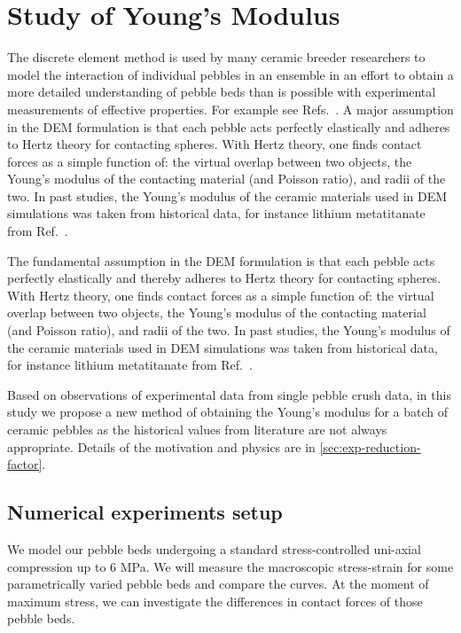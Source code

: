 \section{Study of Young's Modulus}\label{sec:dem-studies-youngs-modulus}

The discrete element method is used by many ceramic breeder researchers to model the interaction of individual pebbles in an ensemble in an effort to obtain a more detailed understanding of pebble beds than is possible with experimental measurements of effective properties. For example see Refs.~\cite{An20071393, Lu2000, Zhao2010, Gan2010a, Annabattula2012a, VanLew2014}. A major assumption in the DEM formulation is that each pebble acts perfectly elastically and adheres to Hertz theory for contacting spheres. With Hertz theory, one finds contact forces as a simple function of: the virtual overlap between two objects, the Young's modulus of the contacting material (and Poisson ratio), and radii of the two. In past studies, the Young's modulus of the ceramic materials  used in DEM simulations was taken from historical data, for instance lithium metatitanate from Ref.~\cite{Gierszewski1998}.


The fundamental assumption in the DEM formulation is that each pebble acts perfectly elastically and thereby adheres to Hertz theory for contacting spheres. With Hertz theory, one finds contact forces as a simple function of: the virtual overlap between two objects, the Young's modulus of the contacting material (and Poisson ratio), and radii of the two. In past studies, the Young's modulus of the ceramic materials  used in DEM simulations was taken from historical data, for instance lithium metatitanate from Ref.~\cite{Gierszewski1998}.

Based on observations of experimental data from single pebble crush data, in this study we propose a new method of obtaining the Young's modulus for a batch of ceramic pebbles as the historical values from literature are not always appropriate. Details of the motivation and physics are in \cref{sec:exp-reduction-factor}.



\subsection{Numerical experiments setup}
We model our pebble beds undergoing a standard stress-controlled uni-axial compression up to 6 MPa. We will measure the macroscopic stress-strain for some parametrically varied pebble beds and compare the curves. At the moment of maximum stress, we can investigate the differences in contact forces of those pebble beds.

